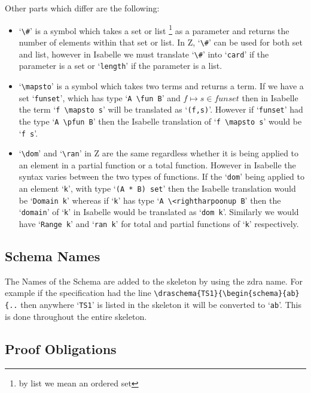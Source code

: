 Other parts which differ are the following:

\begin{itemize}
\item `\verb|\#|' is a symbol which takes a set or list \footnote{by list we mean an ordered set} as a parameter and returns the number of elements within that set or list. In Z, `\verb|\#|' can be used for both set and list, however in Isabelle we must translate `\verb|\#|' into `\verb|card|' if the parameter is a set or `\verb|length|' if the parameter is a list.

\item `\verb|\mapsto|' is a symbol which takes two terms and returns a term. If we have a set `\verb|funset|', which has type `\verb|A \fun B|' and $f \mapsto s \in funset$ then in Isabelle the term `\verb|f \mapsto s|' will be translated as `\verb|(f,s)|'. However if `\verb|funset|' had the type `\verb|A \pfun B|' then the Isabelle translation of `\verb|f \mapsto s|' would be `\verb|f s|'.

\item `\verb|\dom|' and `\verb|\ran|' in Z are the same regardless whether it is being applied to an element in a partial function or a total function. However in Isabelle the syntax varies between the two types of functions. If the `\verb|dom|' being applied to an element `\verb|k|', with type `\verb|(A * B) set|' then the Isabelle translation would be `\verb|Domain k|' whereas if `\verb|k|' has type `\verb|A \<rightharpoonup B|' then the `\verb|domain|' of `\verb|k|' in Isabelle would be translated as `\verb|dom k|'. Similarly we would have `\verb|Range k|' and `\verb|ran k|' for total and partial functions of `\verb|k|' respectively.
\end{itemize}

\subsection{Schema Names}

The Names of the Schema are added to the skeleton by using the \gls{zdra} name. For example if the specification had the line \verb|\draschema{TS1}{\begin{schema}{ab}{..| then anywhere `\texttt{TS1}' is listed in the skeleton it will be converted to `\texttt{ab}'. This is done throughout the entire skeleton.

\subsection{Proof Obligations}


